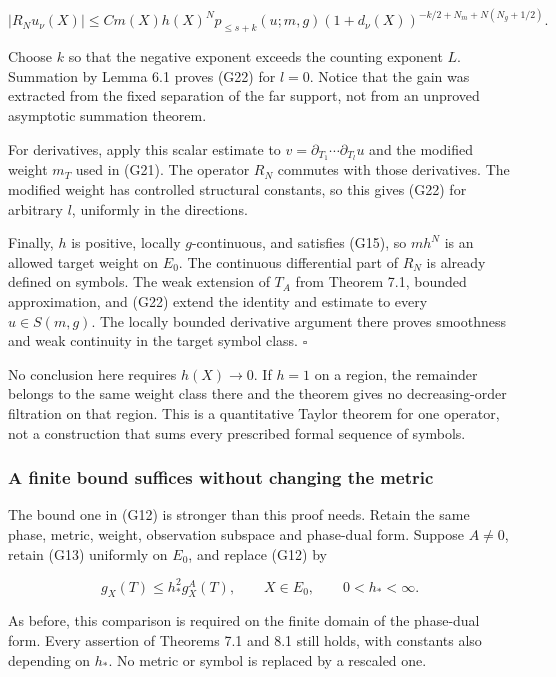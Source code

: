 \documentclass[
  11pt,
]{article}
\begin{document}
\[
|R_Nu_\nu(X)|
\leq C m(X)h(X)^Np_{\leq s+k}(u;m,g)
(1+d_\nu(X))^{-k/2+N_m+N(N_g+1/2)}.
\]

Choose \(k\) so that the negative exponent exceeds the counting exponent
\(L\). Summation by Lemma 6.1 proves (G22) for \(l=0\). Notice that the
gain was extracted from the fixed separation of the far support, not
from an unproved asymptotic summation theorem.

For derivatives, apply this scalar estimate to
\(v=\partial_{T_1}\cdots\partial_{T_l}u\) and the modified weight
\(m_T\) used in (G21). The operator \(R_N\) commutes with those
derivatives. The modified weight has controlled structural constants, so
this gives (G22) for arbitrary \(l\), uniformly in the directions.

Finally, \(h\) is positive, locally \(g\)-continuous, and satisfies
(G15), so \(mh^N\) is an allowed target weight on \(E_0\). The
continuous differential part of \(R_N\) is already defined on symbols.
The weak extension of \(T_A\) from Theorem 7.1, bounded approximation,
and (G22) extend the identity and estimate to every \(u\in S(m,g)\). The
locally bounded derivative argument there proves smoothness and weak
continuity in the target symbol class. \(\square\)

No conclusion here requires \(h(X)\to0\). If \(h=1\) on a region, the
remainder belongs to the same weight class there and the theorem gives
no decreasing-order filtration on that region. This is a quantitative
Taylor theorem for one operator, not a construction that sums every
prescribed formal sequence of symbols.

\subsubsection{A finite bound suffices without changing the
metric}\label{a-finite-bound-suffices-without-changing-the-metric}

The bound one in (G12) is stronger than this proof needs. Retain the
same phase, metric, weight, observation subspace and phase-dual form.
Suppose \(A\ne0\), retain (G13) uniformly on \(E_0\), and replace (G12)
by

\[
 g_X(T)\leq h_*^2g_X^A(T),\qquad X\in E_0,\qquad
 0<h_*<\infty.
 \tag{G24}
\]

As before, this comparison is required on the finite domain of the
phase-dual form. Every assertion of Theorems 7.1 and 8.1 still holds,
with constants also depending on \(h_*\). No metric or symbol is
replaced by a rescaled one.
\end{document}
